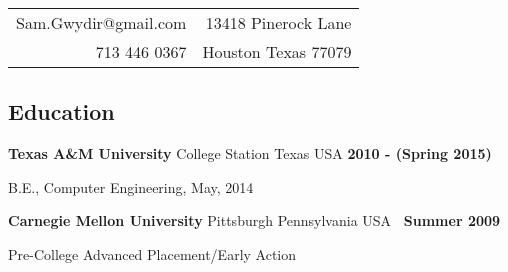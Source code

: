 \documentclass[margin,line]{res}
\newenvironment{list1}{
\begin{list}{\ding{113}}{%
  \setlength{\itemsep}{0in}
  \setlength{\parsep}{0in} \setlength{\parskip}{0in}
  \setlength{\topsep}{0in} \setlength{\partopsep}{0in}
  \setlength{\leftmargin}{0.17in}}}{\end{list}}
\newenvironment{list2}{
\begin{list}{$\bullet$}{%
  \setlength{\itemsep}{0in}
  \setlength{\parsep}{0in} \setlength{\parskip}{0in}
  \setlength{\topsep}{0in} \setlength{\partopsep}{0in}
  \setlength{\leftmargin}{0.2in}}}{\end{list}}
\begin{document}
\hfill
\vspace*{-.45in}
\begin{tabular}{r r}
Sam.Gwydir@gmail.com & 13418 Pinerock Lane\\
713 446 0367 & Houston Texas 77079
\end{tabular}

\vspace*{.1in}
{\color{WildStrawberry}
\begin{resume}
\color{black}
{\color{WildStrawberry}
  \vspace{-.1in}
  \section{\sc Education}}

{\bf Texas A\&M University} College Station Texas USA \hfill {\bf 2010 - (Spring 2015)}\\
\vspace*{-.17in}
\begin{list1}
\item[] B.E., Computer Engineering, May, 2014
\end{list1}
\vspace*{-.15in}

{\bf Carnegie Mellon University} Pittsburgh Pennsylvania USA \hfill {\bf \ Summer 2009}\\
\vspace*{-.17in}
\begin{list1}
\item[] Pre-College Advanced Placement/Early Action \hfill\\
  \vspace{-.15in}
\end{list1}


\end{resume}}
\end{document}
